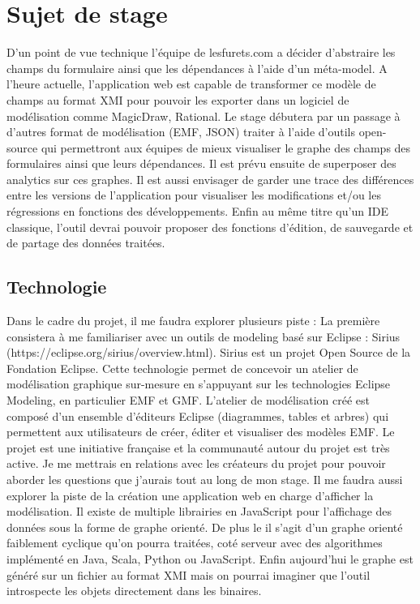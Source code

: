 \chapter{Sujet de stage}
D’un point de vue technique l’équipe de lesfurets.com a décider d’abstraire les champs du formulaire ainsi que les dépendances à l’aide d'un méta-model. A l’heure actuelle, l’application web est capable de transformer ce modèle de champs au format XMI pour pouvoir les exporter dans un logiciel de modélisation comme MagicDraw, Rational. Le stage débutera par un passage à d’autres format de modélisation (EMF, JSON) traiter à l'aide d'outils open-source qui permettront aux équipes de mieux visualiser le graphe des champs des formulaires ainsi que leurs dépendances. Il est prévu ensuite de superposer des analytics sur ces graphes. Il est aussi envisager de garder une trace des différences entre les versions de l’application pour visualiser les modifications et/ou les régressions en fonctions des développements. Enfin au même titre qu’un IDE classique, l’outil devrai pouvoir proposer des fonctions d’édition, de sauvegarde et de partage des données traitées.

\section{Technologie}
Dans le cadre du projet, il me faudra explorer plusieurs piste :
La première consistera à me familiariser avec un outils de modeling basé sur Eclipse : Sirius (https://eclipse.org/sirius/overview.html). Sirius est un projet Open Source de la Fondation Eclipse. Cette technologie permet de concevoir un atelier de modélisation graphique sur-mesure en s'appuyant sur les technologies Eclipse Modeling, en particulier EMF et GMF. L'atelier de modélisation créé est composé d'un ensemble d'éditeurs Eclipse (diagrammes, tables et arbres) qui permettent aux utilisateurs de créer, éditer et visualiser des modèles EMF. Le projet est une initiative française et la communauté autour du projet est très active. Je me mettrais en relations avec les créateurs du projet pour pouvoir aborder les questions que j’aurais tout au long de mon stage.
Il me faudra aussi explorer la piste de la création une application web en charge d’afficher la modélisation. Il existe de multiple librairies en JavaScript pour l’affichage des données sous la forme de graphe orienté. De plus le il s'agit d'un graphe orienté faiblement cyclique qu'on pourra traitées, coté serveur avec des algorithmes implémenté en Java, Scala, Python ou JavaScript. Enfin aujourd’hui le graphe est généré sur un fichier au format XMI mais on pourrai imaginer que l’outil introspecte les objets directement dans les binaires.

